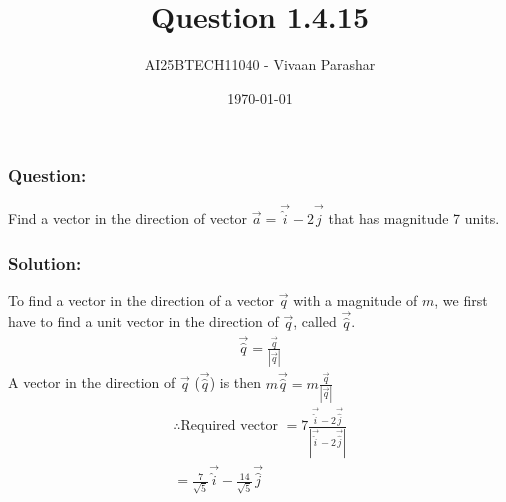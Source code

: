\documentclass{beamer}
\title{Question 1.4.15}
\author{AI25BTECH11040 - Vivaan Parashar}
\date{\today}
\begin{document}
\frame{\titlepage}

\begin{frame}
    \frametitle{Question: }
    Find a vector in the direction of vector $\vec{a} = \vec{\hat{i}} - 2\vec{\hat{j}}$ that has magnitude 7 units.
\end{frame}

\begin{frame}
    \frametitle{Solution: }
    To find a vector in the direction of a vector $\vec{q}$ with a magnitude of $m$, we first have to find a unit vector in the direction of $\vec{q}$, called $\vec{\hat{q}}$.
    \begin{align}
        \vec{\hat{q}} = \frac{\vec{q}}{|\vec{q}|}
    \end{align}
    A vector in the direction of $\vec{q}$ ($\vec{\hat{q}}$) is then $m \vec{\hat{q}} = m\frac{\vec{q}}{|\vec{q}|}$
    \begin{align}
        \therefore \text{Required vector } = 7\frac{\vec{\hat{i}} - 2\vec{\hat{j}}}{|\vec{\hat{i}} - 2\vec{\hat{j}}|} \\
        = \frac{7}{\sqrt{5}}\vec{\hat{i}} - \frac{14}{\sqrt{5}}\vec{\hat{j}}
    \end{align}
\end{frame}
\end{document}
